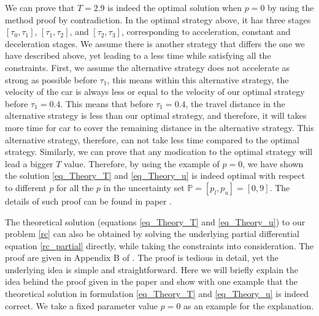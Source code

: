 We can prove that $T=2.9$ is indeed the optimal solution when $p=0$ by using the method proof by contradiction. In the optimal strategy above, it has three stages $[\tau_0, \tau_1]$, $[\tau_1, \tau_2]$, and $[\tau_2, \tau_3]$, corresponding to acceleration, constant and deceleration stages. We assume there is another strategy that differs the one we have described above, yet leading to a less time while satisfying all the constraints. First, we assume the alternative strategy does not accelerate as strong as possible before $\tau_1$, this means within this alternative strategy, the velocity of the car is always less or equal to the velocity of our optimal strategy before $\tau_1=0.4$. This means that before $\tau_1=0.4$, the travel distance in the alternative strategy is less than our optimal strategy, and therefore, it will takes more time for car to cover the remaining distance in the alternative strategy. This alternative strategy, therefore, can not take less time compared to the optimal strategy. Similarly, we can prove that any modication to the optimal strategy will lead a bigger $T$ value. Therefore, by using the example of $p=0$, we have shown the solution \ref{eq_Theory_T} and \ref{eq_Theory_u} is indeed optimal with respect to different $p$ for all the $p$ in the uncertainty set $ \mathbb{P}=[p_l, p_u] =[0,9]$. The details of such proof can be found in paper \cite{MatSch22}. 



The theoretical solution (equations \ref{eq_Theory_T} and \ref{eq_Theory_u}) to our problem \ref{rc} can also be obtained by solving the underlying partial differential equation \ref{rc_partial} directly, while taking the constraints into consideration. The proof are given in Appendix B of \cite{MatSch22}. The proof is tedious in detail, yet the underlying idea is simple and straightforward. Here we will briefly explain the idea behind the proof given in the paper \cite{MatSch22} and show with one example that the theoretical solution in formulation \ref{eq_Theory_T} and \ref{eq_Theory_u} is indeed correct. We take a fixed parameter value $p=0$ as an example for the explanation.

